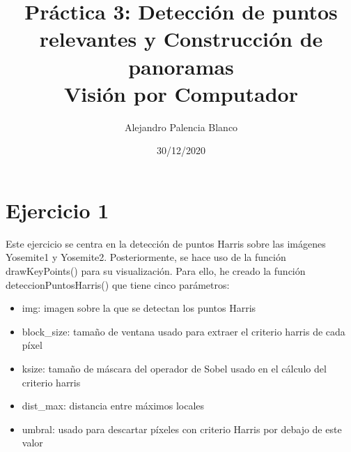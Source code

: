 \documentclass[10pt,a4paper]{article}
\title{
Práctica 3: Detección de puntos relevantes y Construcción de panoramas\\
\large Visión por Computador \\
}
\author{
Alejandro Palencia Blanco\\
}
\date{30/12/2020}
\begin{document}
\maketitle


\section{Ejercicio 1}

Este ejercicio se centra en la detección de puntos Harris sobre las imágenes Yosemite1 y Yosemite2. Posteriormente, se hace uso de la función drawKeyPoints() para su visualización. Para ello, he creado la función deteccionPuntosHarris() que tiene cinco parámetros: 
\begin{itemize}
	\item img: imagen sobre la que se detectan los puntos Harris
	\item block\_size: tamaño de ventana usado para extraer el criterio harris de cada píxel
	\item ksize: tamaño de máscara del operador de Sobel usado en el cálculo del criterio harris
	\item dist\_max: distancia entre máximos locales
	\item umbral: usado para descartar píxeles con criterio Harris por debajo de este valor
\end{itemize}
\end{document}
